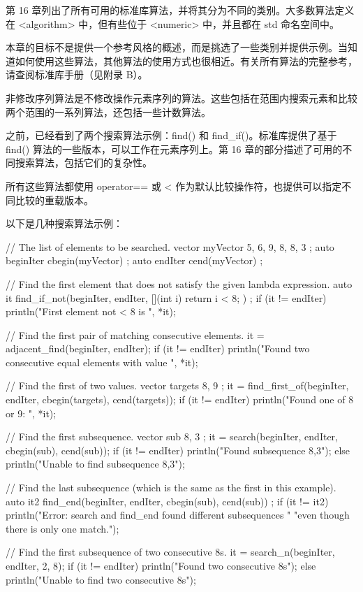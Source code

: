 
第 16 章列出了所有可用的标准库算法，并将其分为不同的类别。大多数算法定义在 <algorithm> 中，但有些位于 <numeric> 中，并且都在 std 命名空间中。

本章的目标不是提供一个参考风格的概述，而是挑选了一些类别并提供示例。当知道如何使用这些算法，其他算法的使用方式也很相近。有关所有算法的完整参考，请查阅标准库手册（见附录 B）。


非修改序列算法是不修改操作元素序列的算法。这些包括在范围内搜索元素和比较两个范围的一系列算法，还包括一些计数算法。


之前，已经看到了两个搜索算法示例：find() 和 find\_if()。标准库提供了基于 find() 算法的一些版本，可以工作在元素序列上。第 16 章的部分描述了可用的不同搜索算法，包括它们的复杂性。

所有这些算法都使用 operator== 或 < 作为默认比较操作符，也提供可以指定不同比较的重载版本。

以下是几种搜索算法示例：

\begin{cpp}
// The list of elements to be searched.
vector myVector { 5, 6, 9, 8, 8, 3 };
auto beginIter { cbegin(myVector) };
auto endIter { cend(myVector) };

// Find the first element that does not satisfy the given lambda expression.
auto it { find_if_not(beginIter, endIter, [](int i){ return i < 8; }) };
if (it != endIter) {
    println("First element not < 8 is {}", *it);
}

// Find the first pair of matching consecutive elements.
it = adjacent_find(beginIter, endIter);
if (it != endIter) {
    println("Found two consecutive equal elements with value {}", *it);
}

// Find the first of two values.
vector targets { 8, 9 };
it = find_first_of(beginIter, endIter, cbegin(targets), cend(targets));
if (it != endIter) {
    println("Found one of 8 or 9: {}", *it);
}

// Find the first subsequence.
vector sub { 8, 3 };
it = search(beginIter, endIter, cbegin(sub), cend(sub));
if (it != endIter) {
    println("Found subsequence {{8,3}}");
} else {
    println("Unable to find subsequence {{8,3}}");
}

// Find the last subsequence (which is the same as the first in this example).
auto it2 { find_end(beginIter, endIter, cbegin(sub), cend(sub)) };
if (it != it2) {
    println("Error: search and find_end found different subsequences "
        "even though there is only one match.");
}

// Find the first subsequence of two consecutive 8s.
it = search_n(beginIter, endIter, 2, 8);
if (it != endIter) {
    println("Found two consecutive 8s");
} else {
    println("Unable to find two consecutive 8s");
}
\end{cpp}

